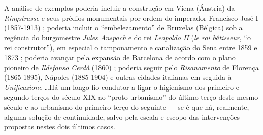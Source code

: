 A análise de exemplos poderia incluir a construção em Viena (Áustria) da \textit{Ringstrasse} e seus prédios monumentais por ordem do imperador Francisco José I (1857-1913) \cite{abercrombie_vienna_1910,abercrombie_vienna_1911,aman_vienna_1911}; poderia incluir o ``embelezamento'' de Bruxelas (Bélgica) sob a regência do burgomestre \textit{Jules Anspach} e do rei \textit{Leopoldo II} (\textit{le roi bâtisseur}, ``o rei construtor''), em especial o tamponamento e canalização do Sena entre 1859 e 1873 \cite{abercrombie_brussels1_1912,abercrombie_brussels2_1912,abercrombie_brussels3_1913}; poderia avançar pela expansão de Barcelona de acordo com o plano pioneiro de \textit{Ildefonso Cerdà} (1860) \cite{aibarbijker_barcelona_1997,ciervo_cerda_1976,soriaypuig_cerda_1995,wynn_barcelona_1979}; poderia seguir pelo \textit{Risanamento} de Florença (1865-1895), Nápoles (1885-1904) e outras cidades italianas em seguida à \textit{Unificazione} \cite{biocca_naples_1992,parisi_napoli_2001,piccinato_igiene_1989,rossi_napoli_2011}\dots Há um longo fio condutor a ligar o higienismo dos primeiro e segundo terços do século XIX ao ``proto-urbanismo'' do último terço deste mesmo século e ao urbanismo do primeiro terço do seguinte --- se é que há, realmente, alguma solução de continuidade, salvo pela escala e escopo das intervenções propostas nestes dois últimos casos. 

